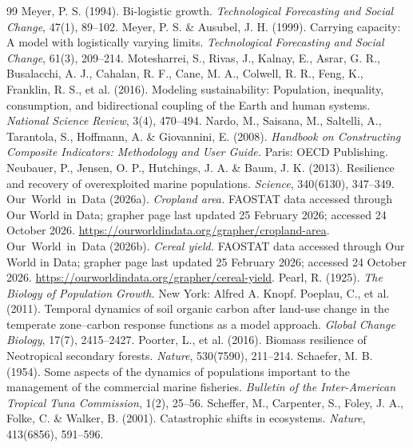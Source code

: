 \documentclass[preprint,12pt,authoryear]{elsarticle}
\begin{document}
\begin{thebibliography}{99}
 Meyer, P. S. (1994). Bi-logistic growth. \emph{Technological Forecasting and Social Change}, 47(1), 89--102.
 Meyer, P. S. \& Ausubel, J. H. (1999). Carrying capacity: A model with logistically varying limits. \emph{Technological Forecasting and Social Change}, 61(3), 209--214.
 Motesharrei, S., Rivas, J., Kalnay, E., Asrar, G. R., Busalacchi, A. J., Cahalan, R. F., Cane, M. A., Colwell, R. R., Feng, K., Franklin, R. S., et al. (2016). Modeling sustainability: Population, inequality, consumption, and bidirectional coupling of the Earth and human systems. \emph{National Science Review}, 3(4), 470--494.
 Nardo, M., Saisana, M., Saltelli, A., Tarantola, S., Hoffmann, A. \& Giovannini, E. (2008). \emph{Handbook on Constructing Composite Indicators: Methodology and User Guide.} Paris: OECD Publishing.
 Neubauer, P., Jensen, O. P., Hutchings, J. A. \& Baum, J. K. (2013). Resilience and recovery of overexploited marine populations. \emph{Science}, 340(6130), 347--349.
 Our~World~in~Data (2026a). \emph{Cropland area.} FAOSTAT data accessed through Our World in Data; grapher page last updated 25 February 2026; accessed 24 October 2026. \url{https://ourworldindata.org/grapher/cropland-area}.
 Our~World~in~Data (2026b). \emph{Cereal yield.} FAOSTAT data accessed through Our World in Data; grapher page last updated 25 February 2026; accessed 24 October 2026. \url{https://ourworldindata.org/grapher/cereal-yield}.
 Pearl, R. (1925). \emph{The Biology of Population Growth.} New York: Alfred A. Knopf.
 Poeplau, C., et al. (2011). Temporal dynamics of soil organic carbon after land-use change in the temperate zone--carbon response functions as a model approach. \emph{Global Change Biology}, 17(7), 2415--2427.
 Poorter, L., et al. (2016). Biomass resilience of Neotropical secondary forests. \emph{Nature}, 530(7590), 211--214.
 Schaefer, M. B. (1954). Some aspects of the dynamics of populations important to the management of the commercial marine fisheries. \emph{Bulletin of the Inter-American Tropical Tuna Commission}, 1(2), 25--56.
 Scheffer, M., Carpenter, S., Foley, J. A., Folke, C. \& Walker, B. (2001). Catastrophic shifts in ecosystems. \emph{Nature}, 413(6856), 591--596.

\end{thebibliography}
\end{document}
